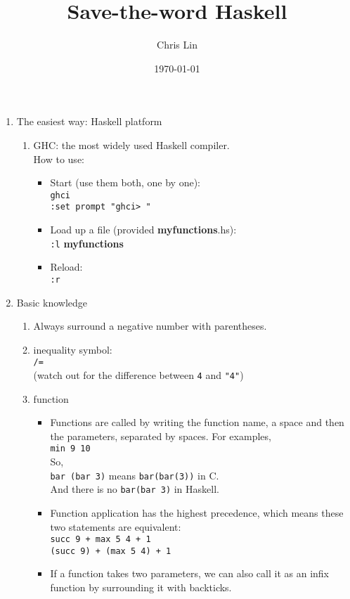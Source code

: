 \documentclass[a4paper,10pt]{article}
\title{Save-the-word Haskell}
\author{Chris Lin}
\date{\today}
\begin{document}
\maketitle

\begin{enumerate}
 \item The easiest way: Haskell platform
 \begin{enumerate}
  \item GHC: the most widely used Haskell compiler.\\
  How to use:
  \begin{itemize}
   \item Start (use them both, one by one):
   \\\texttt{ghci}
   \\\texttt{:set prompt "ghci> "}
   \item Load up a file (provided \textbf{myfunctions}.hs): 
   \\\texttt{:l} \textbf{myfunctions}
   \item Reload:
   \\\texttt{:r}
  \end{itemize}
 \end{enumerate}
 \item Basic knowledge
 \begin{enumerate}
  \item Always surround a negative number with parentheses.
  \item inequality symbol:
  \\\texttt{/=}
  \\(watch out for the difference between \texttt{4} and \texttt{"4"})
  \item function
  \begin{itemize}
  \item Functions are called by writing the function name, a space and then the parameters, separated by spaces. For examples,
  \\\texttt{min 9 10}
  \\So,
  \\\texttt{bar (bar 3)} means \texttt{bar(bar(3))} in C.
  \\And there is no \texttt{bar(bar 3)} in Haskell.
  \item Function application has the highest precedence, which means these two statements are equivalent:
  \\\texttt{succ 9 + max 5 4 + 1}
  \\\texttt{(succ 9) + (max 5 4) + 1}
  \item If a function takes two parameters, we can also call it as an infix function by surrounding it with backticks.

\end{itemize}
\end{enumerate}
\end{enumerate}
\end{document}
